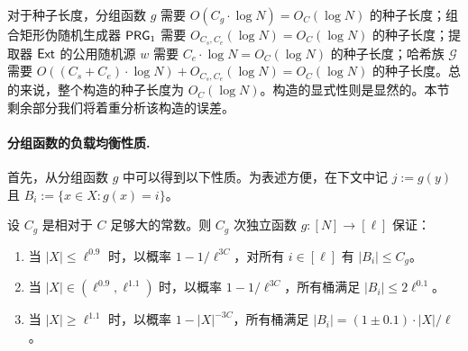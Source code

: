 对于种子长度，分组函数 $g$ 需要 $O(C_g \cdot \log N) = O_C(\log N)$ 的种子长度；组合矩形伪随机生成器 $\mathsf{PRG}_1$ 需要 $O_{C_s, C_e}(\log N) = O_C(\log N)$ 的种子长度；提取器 $\mathsf{Ext}$ 的公用随机源 $w$ 需要 $C_e \cdot \log N = O_C(\log N)$ 的种子长度；哈希族 $\mathcal{G}$ 需要 $O((C_s + C_e) \cdot \log N) + O_{C_s, C_e}(\log N) = O_C(\log N)$ 的种子长度。总的来说，整个构造的种子长度为 $O_C(\log N)$。构造的显式性则是显然的。本节剩余部分我们将着重分析该构造的误差。

\paragraph{分组函数的负载均衡性质.}

首先，从分组函数 $g$ 中可以得到以下性质。为表述方便，在下文中记 $j := g(y)$ 且 $B_i:=\{x \in X : g(x) = i\}$。

\begin{lemma}\label{lem:allocation_small_error}
    设 $C_g$ 是相对于 $C$ 足够大的常数。则 $C_g$ 次独立函数 $g:[N] \rightarrow [\ell]$ 保证：
    \begin{enumerate}
        \item 当 $|X| \le \ell^{0.9}$ 时，以概率 $1 - 1 / \ell^{3 C}$，对所有 $i \in [\ell]$ 有 $|B_i| \le C_g$。

        \item 当 $|X| \in (\ell^{0.9}, \ell^{1.1})$ 时，以概率 $1 - 1 / \ell^{3 C}$，所有桶满足 $|B_i| \le 2 \ell^{0.1}$。
        
        \item 当 $|X| \ge \ell^{1.1}$ 时，以概率 $1-|X|^{-3 C}$，所有桶满足 $|B_i| = (1 \pm 0.1) \cdot |X| / \ell$。
    \end{enumerate}
\end{lemma}

